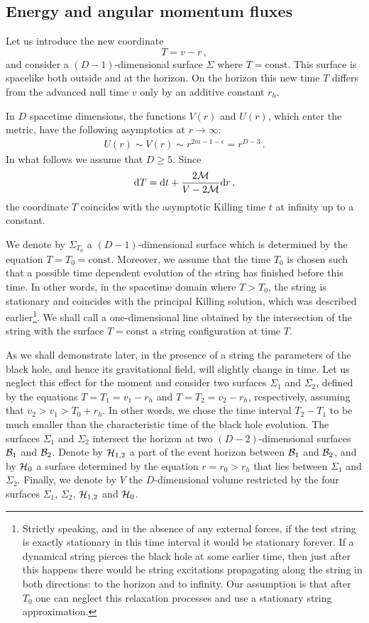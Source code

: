 \documentclass[superscriptaddress,twocolumn,showpacs,
preprintnumbers,amsmath,amssymb,nofootinbib,
longbibliography,aps,prd,10pt]{revtex4-1}
\newcommand{\dd}{\mbox{d}}
\newcommand{\be}{\begin{equation}}             %
\newcommand{\ee}{\end{equation}}               %
\begin{document}
\subsection{Energy and angular momentum fluxes}
Let us introduce the new coordinate
\be
T=v-r\, ,
\ee
and consider a $(D-1)$-dimensional surface $\Sigma$ where $T=\text{const}$. This surface is spacelike both outside and at the horizon. On the horizon this new time $T$ differs from the advanced null time $v$ only by an additive constant $r_h$.

In $D$ spacetime dimensions, the functions $V(r)$ and $U(r)$, which enter the metric, have the following asymptotics at $r \rightarrow \infty$:
\begin{align}
U(r)\sim V(r) \sim r^{2m-1-\epsilon} = r^{D - 3}  \,  .
\end{align}
In what follows we assume that $D\ge 5$. Since
\be
\dd T=\dd t + {2\mathcal{M}\over V-2\mathcal{M}} \dd r\, ,
\ee
the coordinate $T$ coincides with the asymptotic Killing time $t$ at infinity up to a constant.

We denote by $\Sigma_{T_0}$ a $(D-1)$-dimensional surface which is determined by the equation $T=T_0=\text{const}$. Moreover, we assume that the time $T_0$ is chosen such that a possible time dependent evolution of the string has finished before this time. In other words, in the spacetime domain where $T>T_0$, the string is stationary and coincides with the principal Killing solution, which was described earlier\footnote{Strictly speaking, and in the absence of any external forces, if the test string is exactly stationary in this time interval it would be stationary forever. If a dynamical string pierces the black hole at some earlier time, then just after this happens there would be string excitations propagating along the string in both directions: to the horizon and to infinity. Our  assumption is that after $T_0$ one can neglect this relaxation processes and use a stationary string approximation.}. We shall call a one-dimensional line obtained by the intersection of the string with the surface $T=\text{const}$ a string configuration at time $T$.

As we shall demonstrate later, in the presence of a string the parameters of the black hole, and hence its gravitational field, will slightly change in time. Let us neglect this effect for the moment and consider two surfaces $\Sigma_1$ and $\Sigma_2$, defined by the equations $T=T_1=v_1-r_h$ and $T=T_2=v_2-r_h$, respectively, assuming that $v_2>v_1>T_0+r_h$. In other words, we chose the time interval $T_2-T_1$ to be much smaller than the characteristic time of the black hole evolution.
The surfaces $\Sigma_1$ and $\Sigma_2$ intersect the horizon at two $(D-2)$-dimensional surfaces ${\cal B}_1$ and ${\cal B}_2$. Denote by ${\cal H}_{1,2}$ a part of the event horizon between ${\cal B}_1$ and ${\cal B}_2$, and by ${\cal H}_0$ a surface determined by the equation $r=r_0>r_h$ that lies between $\Sigma_1$ and $\Sigma_2$. Finally, we denote by $V$ the $D$-dimensional volume restricted by the four surfaces $\Sigma_1$, $\Sigma_2$, ${\cal H}_{1,2}$ and ${\cal H}_0$.
\end{document}
